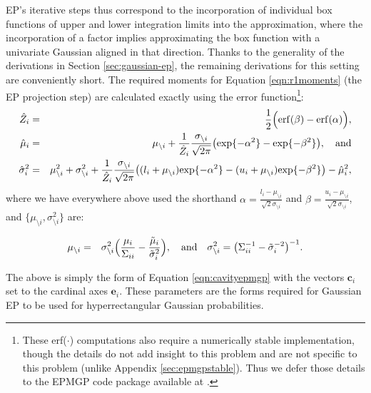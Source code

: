 \documentclass[twoside,11pt]{article}
\def\c{{\mathbf c}}
\def\e{{\mathbf e}}
\newcommand{\wo}{\setminus}
\begin{document}
EP's iterative steps thus correspond to the incorporation of individual box functions of upper and lower integration limits into the approximation, where the incorporation of a factor implies approximating the box function with a univariate Gaussian aligned in that direction.  Thanks to the generality of the derivations in Section \ref{sec:gaussian-ep}, the remaining derivations for this setting are conveniently short.  The required moments for Equation \ref{eqn:r1moments} (the EP projection step) are calculated exactly \cite[]{jawitz2004} using the error function\footnote{These erf($\cdot$) computations also require a numerically stable implementation, though the details do not add insight to this problem and are not specific to this problem (unlike Appendix \ref{sec:epmgpstable}).  Thus we defer those details to the EPMGP code package available at {\tt <url to come with publication>}.}:
%
\begin{eqnarray}
\label{eqn:hat}
\hat{Z}_i & = &
\frac{1}{2}\Bigl(\mathrm{erf}(\beta) -  \mathrm{erf}(\alpha)\Bigr), \\
\hat{\mu}_i & = & \mu_{\wo i} +
\frac{1}{\hat{Z}_i}\frac{\sigma_{\wo i}}{\sqrt{2\pi}}\bigl(\mathrm{exp}\{-\alpha^2\}
- \mathrm{exp}\{-\beta^2\}\bigr),~~~\mathrm{and} \\
\label{eqn:hat3}
\hat{\sigma}_i^2 & = &   \mu_{\wo i}^2 + \sigma_{\wo i}^2 +
\frac{1}{\hat{Z}_i}\frac{\sigma_{\wo i}}{\sqrt{2\pi}}\bigl((l_i +
\mu_{\wo i})\mathrm{exp}\{-\alpha^2\} - (u_i +
\mu_{\wo i})\mathrm{exp}\{-\beta^2\}\bigr) - \hat{\mu}_i^2, 
\end{eqnarray}
%
\noindent where we have everywhere above used the shorthand $\alpha = \frac{l_i -
\mu_{\wo i}}{\sqrt{2}\sigma_{\wo i}}$ and $\beta = \frac{u_i -
\mu_{\wo i}}{\sqrt{2}\sigma_{\wo i}}$, and  $\{\mu_{\wo i},\sigma^2_{\wo i}\}$ are: 


\begin{eqnarray}
\label{eqn:cavityepmgpAxis}
\mu_{\wo i} & = &  \sigma_{\wo i}^2 \Bigl( \frac{\mu_i}{\Sigma_{ii}} - \frac{\tilde{\mu}_i}{\tilde{\sigma}_i^2} \Bigr)
,~~~\mathrm{and}~~~
\sigma^2_{\wo i} = \bigl( \Sigma_{ii}^{-1} - \tilde{\sigma}^{-2}_i\bigr)^{-1}.
\end{eqnarray}

The above is simply the form of  Equation \ref{eqn:cavityepmgp} with the vectors $\c_i$ set to the cardinal axes $\e_i$.  These parameters are the forms required for Gaussian EP to be used for hyperrectangular Gaussian probabilities.  
\end{document}
